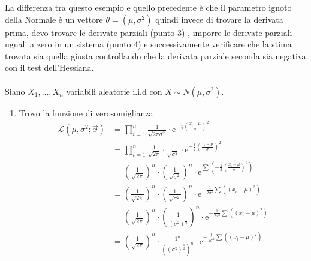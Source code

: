 \documentclass{article}  %
\theoremstyle{definition}
\begin{document}
\begin{esempio}
	La differenza tra questo esempio e quello precedente è che il parametro ignoto della Normale è un vettore $\theta=(\mu, \sigma^2)$ quindi invece di trovare la derivata prima, devo
	trovare le derivate parziali (punto 3) , imporre le derivate parziali uguali a zero in un sistema (punto 4) e successivamente verificare che la stima trovata sia quella giusta controllando
	che la derivata parziale seconda sia negativa con il test dell'Hessiana. \\ \\
	Siano $X_1, \dots, X_n$ variabili aleatorie i.i.d con $X \sim N(\mu, \sigma^2)$.
	\begin{enumerate}
		\item Trovo la funzione di verosomiglianza
		      \begin{align*}
			      \mathscr{L}(\mu, \sigma^2; \vec{x}) & = \prod_{i=1}^{n}\frac{1}{\sqrt{2 \pi \sigma^2}}\cdot \mathrm{e}^{-\frac{1}{2}\left(\frac{x_i-\mu}{\sigma}\right)^2}                                                                          \\
			                                          & = \prod_{i=1}^{n}\frac{1}{\sqrt{2 \pi}} \cdot \frac{1}{\sqrt{\sigma^2}} \cdot \mathrm{e}^{-\frac{1}{2}\left(\frac{x_i-\mu}{\sigma}\right)^2}                                                  \\
			                                          & = \left(\frac{1}{\sqrt{2 \pi}}\right)^n \cdot \left(\frac{1}{\sqrt{\sigma^2}}\right)^n \cdot \mathrm{e}^{\sum \left(-\frac{1}{2}\left(\frac{x_i-\mu}{\sigma}\right)^2\right)}                 \\
			                                          & = \left(\frac{1}{\sqrt{2 \pi}}\right)^n \cdot \left(\frac{1}{\sqrt{\sigma^2}}\right)^n \cdot \mathrm{e}^{-\frac{1}{2\sigma^2} \sum \left(\left({x_i-\mu}\right)^2\right)}                     \\
			                                          & = \left(\frac{1}{\sqrt{2 \pi}}\right)^n \cdot \left(\frac{1}{\left(\sigma^2\right)^\frac{1}{2}}\right)^n \cdot \mathrm{e}^{-\frac{1}{2\sigma^2} \sum \left(\left({x_i-\mu}\right)^2\right)}   \\
			                                          & = \left(\frac{1}{\sqrt{2 \pi}}\right)^n \cdot \frac{1^n}{\left(\left(\sigma^2\right)^\frac{1}{2}\right)^n} \cdot \mathrm{e}^{-\frac{1}{2\sigma^2} \sum \left(\left({x_i-\mu}\right)^2\right)} \\

\end{align*}
\end{enumerate}
\end{esempio}
\end{document}
